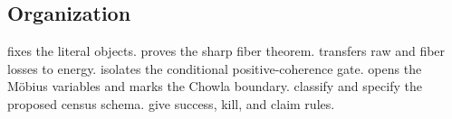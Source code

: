 \subsection{Organization}

 fixes the literal objects.
 proves the sharp fiber theorem.
 transfers raw and fiber losses to energy.
 isolates the conditional
positive-coherence gate.   opens the
M\"obius variables and marks the Chowla boundary.
 classify and
specify the proposed census schema.
give success, kill, and claim rules.
